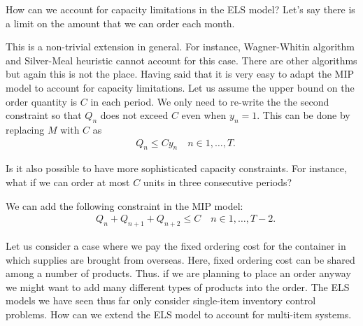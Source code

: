 \begin{question}
How can we account for capacity limitations in the ELS model? Let's say there is a limit on the amount that we can order each month.
\end{question}

\begin{solution}
This is a non-trivial extension in general. For instance, Wagner-Whitin algorithm and Silver-Meal heuristic cannot account for this case. There are other algorithms but again this is not the place. Having said that it is very easy to adapt the MIP model to account for capacity limitations. Let us assume the upper bound on the order quantity is $C$ in each period. We only need to re-write the the second constraint so that $Q_n$ does not exceed $C$ even when $y_n=1$. This can be done by replacing $M$ with $C$ as 
\begin{align*}
	& Q_n \leq C y_n \quad n\in 1,\ldots,T.
\end{align*}
\end{solution}

\begin{question}
Is it also possible to have more sophisticated capacity constraints. For instance, what if we can order at most $C$ units in three consecutive periods?
\end{question}

\begin{solution}
We can add the following constraint in the MIP model:
\begin{align*}
	& Q_n + Q_{n+1} + Q_{n+2} \leq C \quad n\in 1,\ldots,T-2.
\end{align*}
\end{solution}

\begin{question}
Let us consider a case where we pay the fixed ordering cost for the container in which supplies are brought from overseas. Here, fixed ordering cost can be shared among a number of products. Thus. if we are planning to place an order anyway we might want to add many different types of products into the order. The ELS models we have seen thus far only consider single-item inventory control problems. How can we extend the ELS model to account for multi-item systems.
\end{question}

